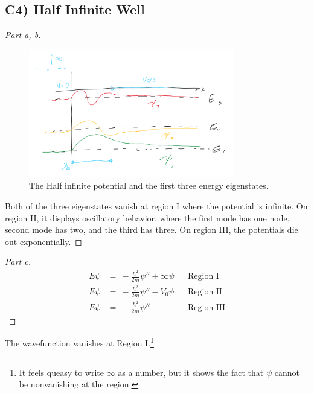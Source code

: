 \documentclass{article}
\numberwithin{equation}{section}
\begin{document}
\subsection*{C4) Half Infinite Well}

\begin{proof}
    [Part a, b]
    \begin{figure}[htp]
        \centering
        \includegraphics[width=0.8\textwidth]{C4_Potential.png} %
        \caption{The Half infinite potential and the first three energy eigenstates. }
        \label{fig:example}
    \end{figure}
    
    Both of the three eigenstates vanish at region I where 
    the potential is infinite. On region II, it displays 
    oscillatory behavior, where the first mode has 
    one node, second mode has two, and the third has three. 
    On region III, the potentials die out exponentially. 
\end{proof}

\begin{proof}
    [Part c] 
    \begin{align}\label{eqn:c4SE}
        E\psi & = \ -\frac {\hbar^2}{2m} \psi'' + \infty\psi && \text{Region I} \\ 
        E\psi & = \ -\frac {\hbar^2}{2m} \psi'' - V_0\psi && \text{Region II} \\ 
        E\psi & = \ -\frac {\hbar^2}{2m} \psi''  && \text{Region III} 
    \end{align}

\end{proof}

    The wavefunction vanishes at Region I.\footnote{
        It feels queasy to write $\infty$ as a number, 
        but it shows the fact that $\psi$ cannot be nonvanishing at the region.
    }
\end{document}
